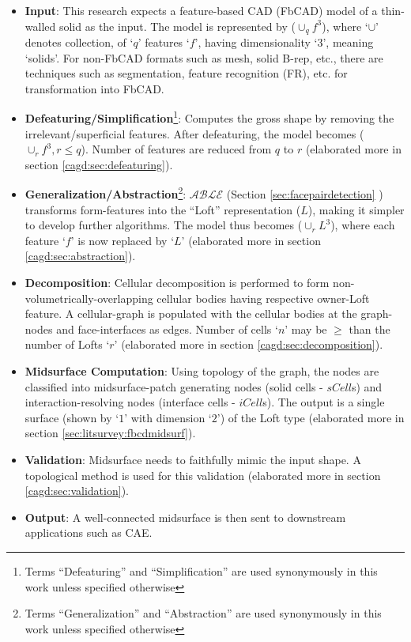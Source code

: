\begin{itemize}[noitemsep,topsep=2pt,parsep=2pt,partopsep=2pt,leftmargin=*]
\item \textbf{Input}: This research expects a feature-based CAD (FbCAD) model of a thin-walled solid as the input.  The model is represented by  ($\cup_qf^3$), where `$\cup$' denotes  collection, of `$q$' features `$f$', having dimensionality `$3$', meaning `solids'. For non-FbCAD formats such as mesh, solid B-rep, etc., there are techniques such as segmentation, feature recognition (FR), etc. for transformation into FbCAD. 

\item \textbf{Defeaturing/Simplification}\footnote{Terms ``Defeaturing'' and ``Simplification'' are used synonymously in this work unless specified otherwise}:  Computes the gross shape by removing the irrelevant/superficial features. After defeaturing, the model becomes ($\cup_rf^3, r \leq q$). Number of features are reduced from $q$ to $r$ \cite{YogeshCADConf2015} (elaborated more in section \ref{cagd:sec:defeaturing}). 

\item \textbf{Generalization/Abstraction}\footnote{Terms ``Generalization'' and ``Abstraction'' are used synonymously in this work unless specified otherwise}: $\mathcal{ABLE}$ (Section \ref{sec:facepairdetection} ) transforms form-features into the ``Loft'' representation ($L$), making it simpler to develop further algorithms. The model thus becomes ($\cup_rL^3$), where each feature `$f$' is now replaced by `$L$' \cite{YogeshIITG2014}  (elaborated more in  section  \ref{cagd:sec:abstraction}). 

\item \textbf{Decomposition}: Cellular decomposition is performed to form non-volumetrically-overlapping cellular bodies having respective owner-Loft feature. A cellular-graph is populated with the cellular bodies at the graph-nodes and face-interfaces as edges. Number of cells `$n$' may be $\geq$ than the number of Lofts `$r$' (elaborated more in section \ref{cagd:sec:decomposition}).

\item \textbf{Midsurface Computation}: Using topology of the graph, the nodes are classified into midsurface-patch generating nodes (solid cells - $sCell$s) and interaction-resolving nodes (interface cells - $iCell$s).  The output is a single surface (shown by `$1$'  with dimension `$2$') of the Loft type (elaborated more in section \ref{sec:litsurvey:fbcdmidsurf}).

\item \textbf{Validation}:  Midsurface needs to faithfully mimic the input shape. A topological method is used for this validation \cite{YogeshCADandA2015} (elaborated more in section \ref{cagd:sec:validation}).

\item \textbf{Output}: A well-connected midsurface is then sent to downstream applications such as CAE.
\end{itemize}

